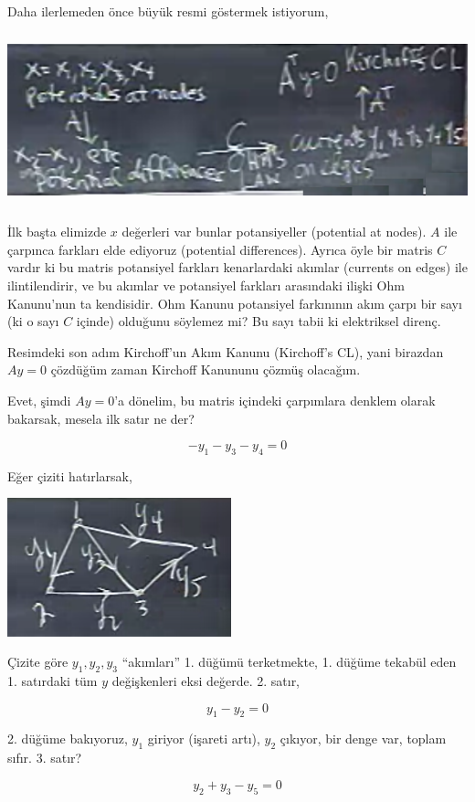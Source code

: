 \documentclass[12pt,fleqn]{article}\usepackage{../../common}
\begin{document}
Daha ilerlemeden önce büyük resmi göstermek istiyorum, 

\includegraphics[height=5cm]{12_9.png}

İlk başta elimizde $x$ değerleri var bunlar potansiyeller (potential at
nodes). $A$ ile çarpınca farkları elde ediyoruz (potential
differences). Ayrıca öyle bir matris $C$ vardır ki bu matris potansiyel
farkları kenarlardaki akımlar (currents on edges) ile ilintilendirir, ve
bu akımlar ve potansiyel farkları arasındaki ilişki Ohm Kanunu'nun ta
kendisidir. Ohm Kanunu potansiyel farkınının akım çarpı bir sayı (ki o sayı
$C$ içinde) olduğunu söylemez mi? Bu sayı tabii ki elektriksel direnç. 

Resimdeki son adım Kirchoff'un Akım Kanunu (Kirchoff's CL), yani birazdan
$Ay=0$ çözdüğüm zaman Kirchoff Kanununu çözmüş olacağım. 

Evet, şimdi $Ay=0$'a dönelim, bu matris içindeki çarpımlara denklem olarak
bakarsak, mesela ilk satır ne der?

$$ -y_1 - y_3 - y_4 = 0 $$

Eğer çiziti hatırlarsak, 

\includegraphics[height=4cm]{12_3.png}

Çizite göre $y_1,y_2,y_3$ ``akımları'' 1. düğümü terketmekte, 1. düğüme
tekabül eden 1. satırdaki tüm $y$ değişkenleri eksi değerde.  2. satır,

$$ y_1 - y_2 = 0$$

2. düğüme bakıyoruz, $y_1$ giriyor (işareti artı), $y_2$ çıkıyor, bir denge
var, toplam sıfır. 3. satır?

$$ y_2 + y_3 - y_5 = 0 $$
\end{document}
